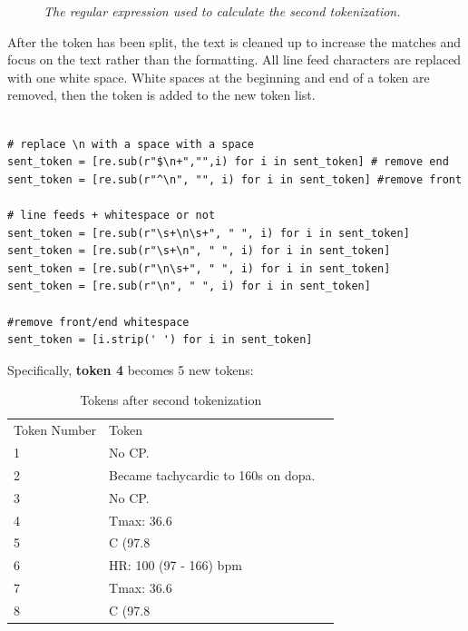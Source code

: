 \documentclass[runningheads,a4paper]{llncs}
\begin{document}
\begin{figure}
 \caption {\emph{The regular expression used to calculate the second tokenization.}}
 \label{regex2}
\end{figure}

\noindent After the token has been split, the text is cleaned up to increase the matches and focus on the text rather than the formatting. All line feed characters are replaced with one white space. White spaces at the beginning and end of a token are removed, then the token is added to the new token list.

\begin{lstlisting}[frame=single, style=customcode]

# replace \n with a space with a space
sent_token = [re.sub(r"$\n+","",i) for i in sent_token] # remove end
sent_token = [re.sub(r"^\n", "", i) for i in sent_token] #remove front

# line feeds + whitespace or not
sent_token = [re.sub(r"\s+\n\s+", " ", i) for i in sent_token]
sent_token = [re.sub(r"\s+\n", " ", i) for i in sent_token]
sent_token = [re.sub(r"\n\s+", " ", i) for i in sent_token]
sent_token = [re.sub(r"\n", " ", i) for i in sent_token]

#remove front/end whitespace
sent_token = [i.strip(' ') for i in sent_token]
\end{lstlisting}


\noindent Specifically, \textbf{token 4} becomes 5 new tokens:

\medskip\noindent%
\begin{table}
\caption{Tokens after second tokenization}
\begin{center}
\renewcommand{\arraystretch}{1.4}
\setlength\tabcolsep{3pt}
\begin{tabular}{lll}
\hline\noalign{\smallskip}
Token Number & Token\\
\noalign{\smallskip}
\hline
\noalign{\smallskip}
 1 & No CP.\\
 2 & Became tachycardic to 160s on dopa. \\
3 & No CP. \\
4 & Tmax: 36.6 \\
5 & C (97.8 \\
6 & HR: 100 (97 - 166) bpm\\
7 & Tmax: 36.6 \\
8 & C (97.8\\
\hline
\end{tabular}
\end{center}
\end{table}
\end{document}
